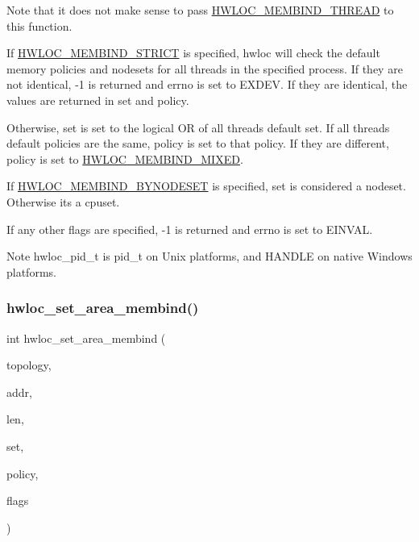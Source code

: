 Note that it does not make sense to pass \hyperlink{a00191_ggab00475fd98815bf4fb9aaf752030e7d2a1dc7dd5cdcd5796893a325a524555298}{H\+W\+L\+O\+C\+\_\+\+M\+E\+M\+B\+I\+N\+D\+\_\+\+T\+H\+R\+E\+AD} to this function.

If \hyperlink{a00191_ggab00475fd98815bf4fb9aaf752030e7d2a0335311a0ee04166df2888d52b4a42c6}{H\+W\+L\+O\+C\+\_\+\+M\+E\+M\+B\+I\+N\+D\+\_\+\+S\+T\+R\+I\+CT} is specified, hwloc will check the default memory policies and nodesets for all threads in the specified process. If they are not identical, -\/1 is returned and errno is set to E\+X\+D\+EV. If they are identical, the values are returned in {\ttfamily set} and {\ttfamily policy}.

Otherwise, {\ttfamily set} is set to the logical OR of all threads\textquotesingle{} default set. If all threads\textquotesingle{} default policies are the same, {\ttfamily policy} is set to that policy. If they are different, {\ttfamily policy} is set to \hyperlink{a00191_ggac9764f79505775d06407b40f5e4661e8a3185bd869b67817fb2bd5164bf360402}{H\+W\+L\+O\+C\+\_\+\+M\+E\+M\+B\+I\+N\+D\+\_\+\+M\+I\+X\+ED}.

If \hyperlink{a00191_ggab00475fd98815bf4fb9aaf752030e7d2a71f19fe4505f1c083dc8e6f7bdea6256}{H\+W\+L\+O\+C\+\_\+\+M\+E\+M\+B\+I\+N\+D\+\_\+\+B\+Y\+N\+O\+D\+E\+S\+ET} is specified, set is considered a nodeset. Otherwise it\textquotesingle{}s a cpuset.

If any other flags are specified, -\/1 is returned and errno is set to E\+I\+N\+V\+AL.

\begin{DoxyNote}{Note}
{\ttfamily hwloc\+\_\+pid\+\_\+t} is {\ttfamily pid\+\_\+t} on Unix platforms, and {\ttfamily H\+A\+N\+D\+LE} on native Windows platforms. 
\end{DoxyNote}
\mbox{\label{a00191_gaf881faefe20701229f07dd7dbd0125ed}} 
\subsubsection{\texorpdfstring{hwloc\+\_\+set\+\_\+area\+\_\+membind()}{hwloc\_set\_area\_membind()}}
{\footnotesize\ttfamily int hwloc\+\_\+set\+\_\+area\+\_\+membind (\begin{DoxyParamCaption}\item[{\hyperlink{a00186_ga9d1e76ee15a7dee158b786c30b6a6e38}{hwloc\+\_\+topology\+\_\+t}}]{topology,  }\item[{const void $\ast$}]{addr,  }\item[{size\+\_\+t}]{len,  }\item[{\hyperlink{a00205_gae991a108af01d408be2776c5b2c467b2}{hwloc\+\_\+const\+\_\+bitmap\+\_\+t}}]{set,  }\item[{\hyperlink{a00191_gac9764f79505775d06407b40f5e4661e8}{hwloc\+\_\+membind\+\_\+policy\+\_\+t}}]{policy,  }\item[{int}]{flags }\end{DoxyParamCaption})}




